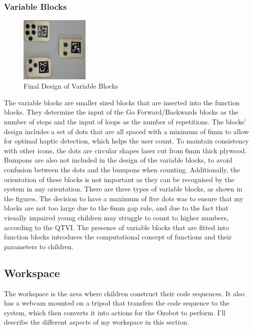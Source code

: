 \documentclass[oneside,%
                    author={Malak Hajji},
                    degree={BSc},
                    title={Designing An Accessible Ozobot Programming Platform for Students},
                  subtitle={With Mixed Visual Abilities}]{dissertation}
\begin{document}
\subsubsection{Variable Blocks}
\FloatBarrier
\begin{figure}[h]
    \centering
    \includegraphics[width=0.3\textwidth]{thesis/finalvariable.eps}
    \caption{Final Design of Variable Blocks}
    \label{fig-variables}
\end{figure}
\FloatBarrier
The variable blocks are smaller sized blocks that are inserted into the function blocks. They determine the input of the Go Forward/Backwards blocks as the number of steps and the input of loops as the number of repetitions. The blocks' design includes a set of dots that are all spaced with a minimum of 6mm to allow for optimal haptic detection, which helps the user count. To maintain consistency with other icons, the dots are circular shapes laser cut from 6mm thick plywood. Bumpons are also not included in the design of the variable blocks, to avoid confusion between the dots and the bumpons when counting. Additionally, the orientation of these blocks is not important as they can be recognised by the system in any orientation. There are three types of variable blocks, as shown in the figures. The decision to have a maximum of five dots was to ensure that my blocks are not too large due to the 6mm gap rule, and due to the fact that visually impaired young children may struggle to count to higher numbers, according to the QTVI. The presence of variable blocks that are fitted into function blocks introduces the computational concept of functions and their parameters to children. 

\subsection{Workspace}
The workspace is the area where children construct their code sequences. It also has a webcam mounted on a tripod that transfers the code sequence to the system, which then converts it into actions for the Ozobot to perform. I'll describe the different aspects of my workspace in this section.
\end{document}
